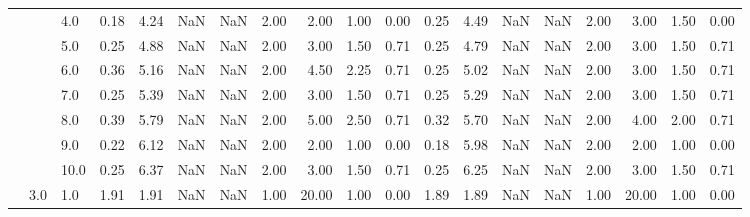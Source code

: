 \begin{tabular}{lllrrrrrrrrrrrrrrrr}
       &     & 4.0  &      0.18 &       4.24 &               NaN &                NaN & 2.00 &   2.00 &             1.00 &                         0.00 &      0.25 &       4.49 &               NaN &                NaN & 2.00 &   3.00 &             1.50 &                         0.00 \\
       &     & 5.0  &      0.25 &       4.88 &               NaN &                NaN & 2.00 &   3.00 &             1.50 &                         0.71 &      0.25 &       4.79 &               NaN &                NaN & 2.00 &   3.00 &             1.50 &                         0.71 \\
       &     & 6.0  &      0.36 &       5.16 &               NaN &                NaN & 2.00 &   4.50 &             2.25 &                         0.71 &      0.25 &       5.02 &               NaN &                NaN & 2.00 &   3.00 &             1.50 &                         0.71 \\
       &     & 7.0  &      0.25 &       5.39 &               NaN &                NaN & 2.00 &   3.00 &             1.50 &                         0.71 &      0.25 &       5.29 &               NaN &                NaN & 2.00 &   3.00 &             1.50 &                         0.71 \\
       &     & 8.0  &      0.39 &       5.79 &               NaN &                NaN & 2.00 &   5.00 &             2.50 &                         0.71 &      0.32 &       5.70 &               NaN &                NaN & 2.00 &   4.00 &             2.00 &                         0.71 \\
       &     & 9.0  &      0.22 &       6.12 &               NaN &                NaN & 2.00 &   2.00 &             1.00 &                         0.00 &      0.18 &       5.98 &               NaN &                NaN & 2.00 &   2.00 &             1.00 &                         0.00 \\
       &     & 10.0 &      0.25 &       6.37 &               NaN &                NaN & 2.00 &   3.00 &             1.50 &                         0.71 &      0.25 &       6.25 &               NaN &                NaN & 2.00 &   3.00 &             1.50 &                         0.71 \\
       & 3.0 & 1.0  &      1.91 &       1.91 &               NaN &                NaN & 1.00 &  20.00 &             1.00 &                         0.00 &      1.89 &       1.89 &               NaN &                NaN & 1.00 &  20.00 &             1.00 &                         0.00 \\

\end{tabular}
